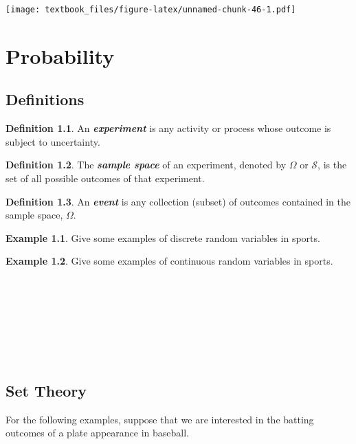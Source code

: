 \documentclass[
  11pt,
]{book}
\theoremstyle{definition}
\newtheorem{definition}{Definition}[chapter]
\theoremstyle{definition}
\newtheorem{example}{Example}[chapter]
\theoremstyle{definition}
\theoremstyle{definition}
\theoremstyle{remark}
\begin{document}
\texttt{[image: textbook\_files/figure-latex/unnamed-chunk-46-1.pdf]}

\hypertarget{probability}{%
\chapter{Probability}\label{probability}}

\hypertarget{definitions-1}{%
\section{Definitions}\label{definitions-1}}

\begin{definition}
An \textbf{\emph{experiment}} is any activity or process whose outcome is subject to uncertainty.
\end{definition}

\begin{definition}
The \textbf{\emph{sample space}} of an experiment, denoted by \(\Omega\) or \(\mathcal{S}\), is the set of all possible outcomes of that experiment.
\end{definition}

\begin{definition}
An \textbf{\emph{event}} is any collection (subset) of outcomes contained in the sample space, \(\Omega\).
\end{definition}

\begin{example}
Give some examples of discrete random variables in sports.
\end{example}

\hfill\break
\hfill\break
\hfill\break
\hfill\break
\hfill\break

\begin{example}
Give some examples of continuous random variables in sports.
\end{example}

~\\
\strut \\
\strut \\
\strut \\

\newpage

\hypertarget{set-theory}{%
\section{Set Theory}\label{set-theory}}

For the following examples, suppose that we are interested in the batting outcomes of a plate appearance in baseball.
\end{document}

